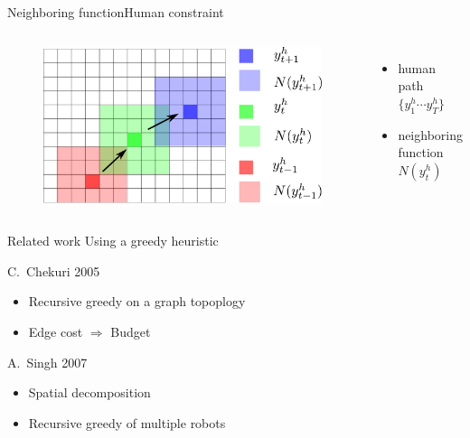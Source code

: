 \begin{frame}{Neighboring function}{Human constraint}
	\begin{columns}
		\begin{minipage}[c]{\linewidth}
			\begin{figure}
				\centering
				\includegraphics[width = \textwidth]{./figure/humanConstraint}
			\end{figure}
		\end{minipage}
		
		\begin{minipage}[c]{\linewidth}
			\begin{itemize}
				\item { human path $ \{ y^{h}_{1} \cdots y^{h}_{T} \} $ }
				\item { neighboring function $ N( y^{h}_{t} ) $ }
			\end{itemize}
		\end{minipage}
	\end{columns}
	
\end{frame}

\begin{frame}{Related work}{ Using a greedy heuristic}
\begin{block}{C.~Chekuri 2005\cite{1530718}}
\begin{itemize}
\item Recursive greedy on a graph topoplogy
\item Edge cost $ \Rightarrow $ Budget 
\end{itemize}
\end{block}
\begin{block}{A.~Singh 2007\cite{singh2007efficient}}
\begin{itemize}
\item Spatial decomposition
\item Recursive greedy of multiple robots
\end{itemize}
\end{block}
\end{frame}

